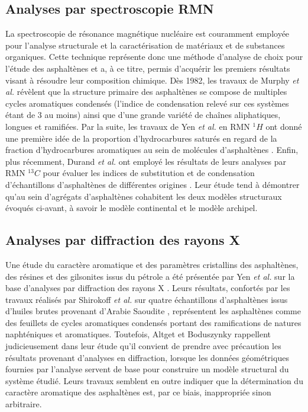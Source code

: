 	
	
	\subsection{Analyses par spectroscopie RMN}
	
	La spectroscopie de résonance magnétique nucléaire est couramment employée pour l'analyse structurale et la caractérisation de matériaux et de substances organiques. 
	Cette technique représente donc une méthode d'analyse de choix pour l'étude des asphaltènes et a, à ce titre, permis d'acquérir les premiers résultats visant à résoudre leur composition chimique. Dès 1982, les travaux de Murphy \textit{et al.} \cite{murphy1982determination} révèlent que la structure primaire des asphaltènes se compose de multiples cycles aromatiques condensés (l'indice de condensation relevé sur ces systèmes étant de 3 au moins) ainsi que d'une grande variété de chaînes aliphatiques, longues et ramifiées. Par la suite, les travaux de Yen \textit{et al.} en RMN $^{1}H$ ont donné une première idée de la proportion d'hydrocarbures saturés en regard de la fraction d'hydrocarbures aromatiques au sein de molécules d'asphaltènes  \cite{yen1984study}. Enfin, plus récemment, Durand \textit{et al.} ont employé les résultats de leurs analyses par RMN $^{13}C$ pour évaluer les indices de substitution et de condensation d'échantillons d'asphaltènes de différentes origines \cite{durand2010effect}. Leur étude tend à démontrer qu'au sein d'agrégats d'asphaltènes cohabitent les deux modèles structuraux évoqués ci-avant, à savoir le modèle continental et le modèle archipel. 
	
	
	\subsection{Analyses par diffraction des rayons X}  
	
	Une étude du caractère aromatique et des paramètres cristallins des asphaltènes, des résines et des gilsonites issus du pétrole a été présentée par Yen \textit{et al.} sur la base d'analyses par diffraction des rayons X \cite{yen1961investigation}. Leurs résultats, confortés par les travaux réalisés par Shirokoff \textit{et al.} sur quatre échantillons d'asphaltènes issus d'huiles brutes provenant d'Arabie Saoudite \cite{shirokoff1997characterization}, représentent les asphaltènes comme des feuillets de cycles aromatiques condensés portant des ramifications de natures naphténiques et aromatiques.
	Toutefois, Altget et Boduszynky rappellent judicieusement dans leur étude \cite{altgeltcomposition} qu'il convient de prendre avec précaution les résultats provenant d'analyses en diffraction, lorsque les données géométriques fournies par l'analyse servent de base pour construire un modèle structural du système étudié. Leurs travaux semblent en outre indiquer que la détermination du caractère aromatique des asphaltènes est, par ce biais, inappropriée sinon arbitraire. 
	
